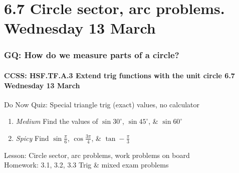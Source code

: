 \documentclass{beamer}
\begin{document}
\section{6.7 Circle sector, arc problems. Wednesday 13 March}
  \frame
  {
    \frametitle{GQ: How do we measure parts of a circle?}
    \framesubtitle{CCSS: HSF.TF.A.3 Extend trig functions with the unit circle  \hfill \alert{6.7 Wednesday 13 March}}

    \begin{block}{Do Now Quiz: Special triangle trig (exact) values, no calculator}
    \begin{enumerate}
        \item \emph{Medium} Find the values of $\sin 30^\circ$, $\sin 45^\circ$, \& $\sin 60^\circ$
        \item \emph{Spicy} Find $\sin \frac{\pi}{6}$, $\cos \frac{3\pi}{4}$, \& $\tan -\frac{\pi}{3}$
    \end{enumerate}
    \end{block}
    Lesson: Circle sector, arc problems, work problems on board\\%
    Homework: 3.1, 3.2, 3.3 Trig \& mixed exam problems
  }
\end{document}

